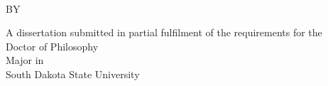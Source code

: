 \documentclass[SDSUThesis.tex]{subfiles}
\begin{document}
\begin{titlepage}
\center

\yourtitle\\

\vspace{2.75in}

BY\\[1ex]
\yourname  %

\vfill

A dissertation submitted in partial fulfilment of the requirements for the\\
Doctor of Philosophy\\
Major in \yourmajor\\
South Dakota State University\\
\number\year
\end{titlepage}
\end{document}

